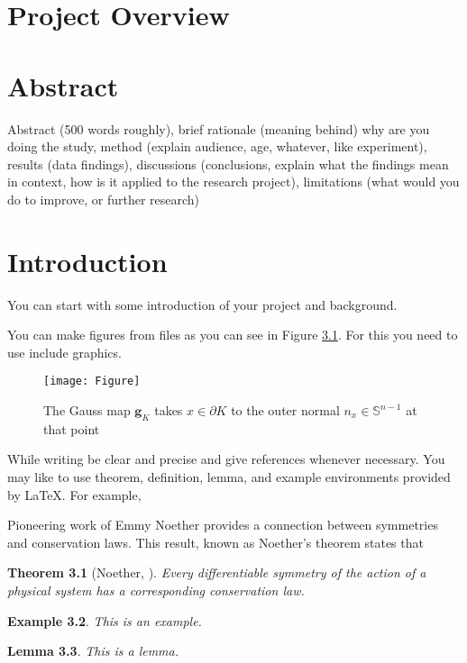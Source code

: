 \documentclass[12pt, a4paper,oneside]{book}
\newtheorem{theorem}{Theorem}[section]
\newtheorem{lemma}[theorem]{Lemma}
\newtheorem{example}[theorem]{Example}
\numberwithin{equation}{section}
\begin{document}
\chapter{Project Overview}\label{ch:x}


\chapter{Abstract}\label{ch:x}
Abstract (500 words roughly), brief rationale (meaning behind) why are you doing the study, method (explain audience, age, whatever, like experiment), results (data findings), discussions (conclusions, explain what the findings mean in context, how is it applied to the research project), limitations (what would you do to improve, or further research)

\chapter{Introduction}\label{ch:x}

You can start with some introduction of your project and background.


You can make figures  from files as you can see in Figure \ref{fig:A3.1}. For this you need to use include graphics.

\begin{figure}[htb]
\centerline{\texttt{[image: Figure]}}
\caption{The Gauss map $\mathbf{g}_{K}$ takes $x\in \partial K$ to the outer normal $n_x\in\mathbb{S}^{n-1}$ at that point}
\label{fig:A3.1}
\end{figure}


While writing be clear and precise and give references whenever necessary. You may like to use theorem, definition, lemma, and example environments provided by \LaTeX. For example,

Pioneering work of Emmy Noether \cite{Noether} provides a connection between symmetries and conservation laws. This result, known as Noether's theorem states that

\begin{theorem}[Noether, \cite{Noether}]
Every differentiable symmetry of the action of a physical system has a corresponding conservation law.
\end{theorem}

\begin{example}
This is an example.
\end{example}

\begin{lemma}
This is a lemma.
\end{lemma}
\end{document}
